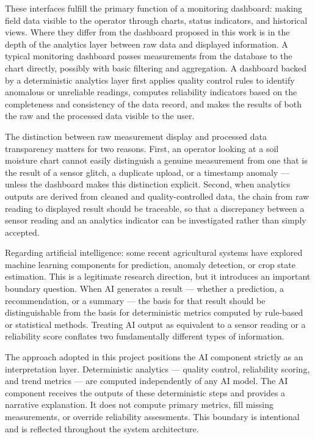 These interfaces fulfill the primary function of a monitoring dashboard:
making field data visible to the operator through charts, status indicators,
and historical views. Where they differ from the dashboard proposed in this
work is in the depth of the analytics layer between raw data and displayed
information. A typical monitoring dashboard passes measurements from the
database to the chart directly, possibly with basic filtering and
aggregation. A dashboard backed by a deterministic analytics layer first
applies quality control rules to identify anomalous or unreliable readings,
computes reliability indicators based on the completeness and consistency of
the data record, and makes the results of both the raw and the processed data
visible to the user.

The distinction between raw measurement display and processed data
transparency matters for two reasons. First, an operator looking at a soil
moisture chart cannot easily distinguish a genuine measurement from one that
is the result of a sensor glitch, a duplicate upload, or a timestamp anomaly
--- unless the dashboard makes this distinction explicit. Second, when
analytics outputs are derived from cleaned and quality-controlled data, the
chain from raw reading to displayed result should be traceable, so that a
discrepancy between a sensor reading and an analytics indicator can be
investigated rather than simply accepted.

Regarding artificial intelligence: some recent agricultural systems have
explored machine learning components for prediction, anomaly detection, or
crop state estimation. This is a legitimate research direction, but it
introduces an important boundary question. When AI generates a result ---
whether a prediction, a recommendation, or a summary --- the basis for that
result should be distinguishable from the basis for deterministic metrics
computed by rule-based or statistical methods. Treating AI output as
equivalent to a sensor reading or a reliability score conflates two
fundamentally different types of information.

The approach adopted in this project positions the AI component strictly as
an interpretation layer. Deterministic analytics --- quality control,
reliability scoring, and trend metrics --- are computed independently of any
AI model. The AI component receives the outputs of these deterministic steps
and provides a narrative explanation. It does not compute primary metrics,
fill missing measurements, or override reliability assessments. This boundary
is intentional and is reflected throughout the system architecture.

